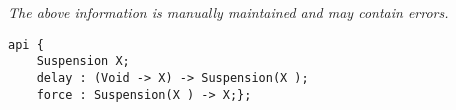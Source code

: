 \label{api:Lazy}

{\tiny \it The above information is manually maintained and may contain errors.}
\begin{verbatim}
api {
    Suspension X;
    delay : (Void -> X) -> Suspension(X );
    force : Suspension(X ) -> X;};
\end{verbatim}
